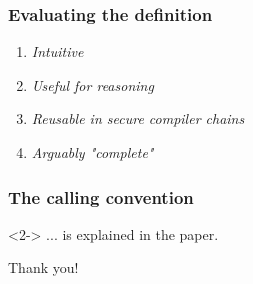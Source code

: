 \documentclass[aspectratio=169]{beamer}
\begin{document}
\begin{frame}
  \frametitle{Evaluating the definition}
  \begin{enumerate}
  \item {\itshape Intuitive}\\
\item {\itshape Useful for reasoning}\\%
\item {\itshape Reusable in secure compiler chains}\\%
\item {\itshape Arguably "complete"}\\%
\end{enumerate}
\end{frame}

\begin{frame}
  \frametitle{The \stktokens{} calling convention}
  \begin{onslide}<2->
    ... is explained in the paper.
  \end{onslide}
\end{frame}


\begin{frame}
  \centering
  Thank you!
\end{frame}

\end{document}
